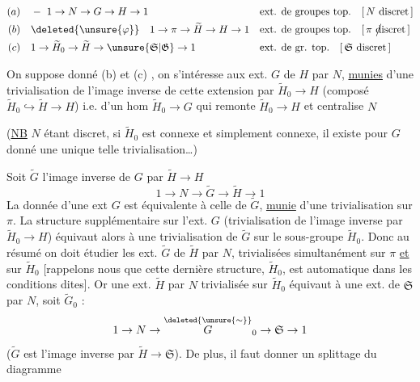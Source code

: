 \[
\begin{aligned}
(a)&\quad -\ 1\to N\to G\to H\to1
 &&\text{ext. de groupes top.}\quad [\,N\text{ discret}\,]\\
(b)&\quad \deleted{\unsure{\varphi}}\quad 1\to\pi\to\widetilde H\to H\to1
 &&\text{ext. de groupes top.}\quad [\,\pi\text{ \rlap{\(\big/\)}discret}\,]\\
(c)&\quad 1\to\widetilde H_0\to\widetilde H\to\unsure{\mathfrak S|\mathfrak G}\to1
 &&\text{ext. de gr. top.}\quad [\,\mathfrak S\text{ discret}\,]
\end{aligned}
\]

On suppose donné (b) et (c) , on s'intéresse aux ext. $G$ de $H$ par $N$, \uline{munies} d'une trivialisation  de l'image inverse de cette extension par $\widetilde H_0\to H$ (composé $\widetilde H_0\hookrightarrow\widetilde H\to H$) i.e. d'un hom $\widetilde H_0\to G$ qui remonte $\widetilde H_0\to H$ et centralise $N$

(\uline{NB} $N$ étant discret, si $\widetilde H_0$ est connexe et simplement connexe, il existe pour $G$ donné une unique telle trivialisation\ldots)

Soit $\widetilde G$ l'image inverse de $G$ par $\widetilde H\to H$
\[
1\to N\to\widetilde G\to\widetilde H\to1
\]
La donnée d'une ext $G$ est équivalente à celle de $\widetilde G$, \uline{munie} d'une trivialisation  sur $\pi$. La  structure supplémentaire sur l'ext. $G$ (trivialisation de l'image inverse par $\widetilde H_0\to H$) équivaut alors à une trivialisation  de $\widetilde G$ sur le sous-groupe $\widetilde H_0$. Donc au résumé on doit étudier les ext. $\widetilde G$ de $\widetilde H$ par $N$, trivialisées  simultanément sur $\pi$ \uline{et} sur $\widetilde H_0$ [rappelons nous que cette dernière structure,   $\widetilde H_0$, est automatique dans les conditions dites]. Or une ext.   $\widetilde H$ par $N$ trivialisée  sur $\widetilde H_0$ équivaut à une ext. de $\mathfrak S$ par $N$, soit $\widetilde G_0$ :
\[
1\to N\to\overset{\deleted{\unsure{\sim}}}{G}_0\to\mathfrak S\to1
\]
($\widetilde G$ est l'image inverse par $\widetilde H\to\mathfrak S$). De plus, il faut donner un splittage  du diagramme
